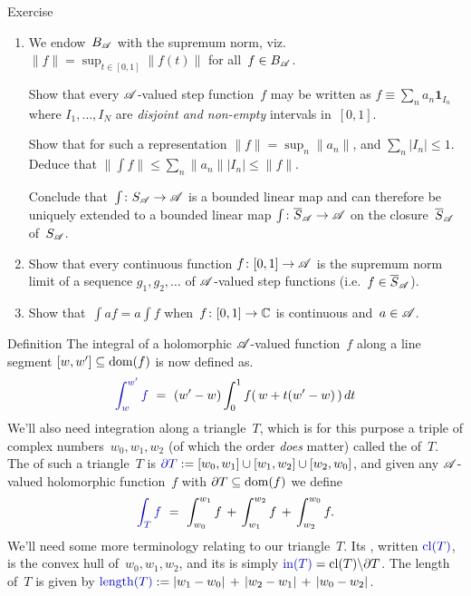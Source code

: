 \documentclass[a]{subfiles}
\begin{document}
\begin{parsec}
\begin{point}{Exercise}
\begin{enumerate}
\item
We endow~$B_{\mathscr{A}}$
with the supremum norm,
viz.~$\|f\|=\sup_{t\in[0,1]} \|f(t)\|$
for all~$f\in B_{\mathscr{A}}$.

Show that every $\mathscr{A}$-valued step function~$f$
may be written as
$f\equiv \sum_n a_n \mathbf{1}_{I_n}$
where $I_1,\dotsc,I_N$
are \emph{disjoint and non-empty}
intervals in~$[0,1]$.

Show that 
for such a representation
$\|f\|=\sup_n \|a_n\|$, and
$\sum_n \left|I_n\right|\leq 1$.
Deduce that
$\|\int f\| \leq \sum_n \|a_n\|\left|I_n\right|
\leq \|f\|$.

Conclude that~$\int\colon S_{\mathscr{A}}\to\mathscr{A}$
is a bounded linear map
and can therefore
be uniquely extended to a bounded linear map
$\int\colon \overline{S}_{\mathscr{A}}\to\mathscr{A}$
on the closure~$\overline{S}_{\mathscr{A}}$
of~$S_{\mathscr{A}}$.

\item
Show that every continuous function $f\colon [0,1]\to\mathscr{A}$
is the supremum norm limit
of a sequence $g_1,g_2,\dotsc$
of $\mathscr{A}$-valued step functions
 (i.e.~$f\in\overline{S}_{\mathscr{A}}$).

\item
Show that~$\int af = a\int f$
when~$f\colon [0,1]\to\mathbb{C}$
is continuous and~$a\in \mathscr{A}$.
\end{enumerate}
\end{point}
\begin{point}{Definition}%
The integral of
a holomorphic $\mathscr{A}$-valued function~$f$
along a line segment $[w,w']\subseteq\operatorname{dom}(f)$
is now defined as.
\begin{equation*}
\Define{\int_{w}^{w'}f}
\ = \ 
(w'-w)\int_0^1f(\,w+t(w'-w)\,)\,dt
\end{equation*}
%
We'll also need integration along a triangle~$T$,%
which is for this  purpose a triple of 
complex numbers~$w_0,w_1,w_2$
(of which the order \emph{does} matter)
called the
 of~$T$.
The  of
such a triangle~$T$
is $\Define{\partial T}
:=[w_0,w_1]\cup [w_1,w_2]\cup [w_2,w_0]$,
and given any $\mathscr{A}$-valued
holomorphic function~$f$
with $\partial T\subseteq \operatorname{dom}(f)$
we define
\begin{equation*}
	\Define{\int_T f}\ = \ \int_{w_0}^{w_1} f
\,+\, \int_{w_1}^{w_2} f
\,+\, \int_{w_2}^{w_0} f.
\end{equation*}
%
We'll need some more terminology
relating to our triangle~$T$.
Its ,
written $\Define{\mathrm{cl}(T)}$,
is the convex hull of~$w_0,w_1,w_2$,
and its 
is simply
$\Define{\mathrm{in}(T)}=\mathrm{cl}(T)\backslash \partial T$.
The length
of~$T$ is given by
$\Define{\mathrm{length}(T)}:=
\left|w_1-w_0\right|\,+\,
\left|w_2-w_1\right|\,+\,
\left|w_0-w_2\right|$.


\end{point}
\end{parsec}
\end{document}
